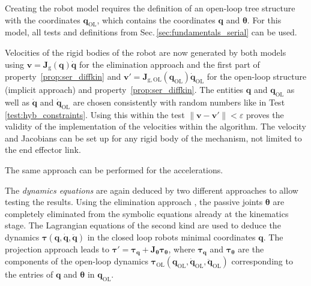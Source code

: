 \documentclass[runningheads]{llncs}
\begin{document}

\begin{property}\label{prop:hyb_velo}
Creating the robot model requires the definition of an open-loop tree structure with the coordinates $\bm{q}_\mathrm{OL}$, which contains the coordinates $\bm{q}$ and $\bm{\theta}$. For this model, all tests and definitions from Sec.\,\ref{sec:fundamentals_serial} can be used. 
\end{property}

\begin{test}\label{test:hyb_velo}
Velocities of the rigid bodies of the robot are now generated by both models using
$\bm{v}{=}\bm{J}_{\mathrm{g}}(\bm{q})\dot{\bm{q}}$ for the elimination approach and the first part of property~\ref{prop:ser_diffkin}
and
$\bm{v}'{=}\bm{J}_{\mathrm{g,OL}}(\bm{q}_{\mathrm{OL}})\dot{\bm{q}}_{\mathrm{OL}}$ for the open-loop structure (implicit approach) and property~\ref{prop:ser_diffkin}.
The entities $\bm{q}$ and $\bm{q}_{\mathrm{OL}}$ as well as $\dot{\bm{q}}$ and $\dot{\bm{q}}_{\mathrm{OL}}$ are chosen consistently with random numbers like in Test\,\ref{test:hyb_constraints}.
Using this within the test $\lVert \bm{v}{-}\bm{v}' \rVert {<} \varepsilon$ proves the validity of the implementation of the velocities within the algorithm.
The velocity and Jacobians can be set up for any rigid body of the mechanism, not limited to the end effector link.
\end{test}
The same approach can be performed for the accelerations.


\begin{property}\label{prop:hyb_dyn}
The \emph{dynamics equations} are again deduced by two different approaches to allow testing the results.
Using the elimination approach \cite{SchapplerLilHad2019}, the passive joints $\bm{\theta}$ are completely eliminated from the symbolic equations already at the kinematics stage.
The Lagrangian equations of the second kind are used to deduce the dynamics $\bm{\tau}(\bm{q},\dot{\bm{q}},\ddot{\bm{q}})$ in the closed loop robots minimal coordinates $\bm{q}$.
The projection approach leads to $\bm{\tau}'{=}\bm{\tau}_{\bm{q}}{+}\bm{J}_{\bm{\theta}}\bm{\tau}_{\bm{\theta}}$, where $\bm{\tau}_{\bm{q}}$ and $\bm{\tau}_{\bm{\theta}}$ are the components of the open-loop dynamics $\bm{\tau}_{\mathrm{OL}}(\bm{q}_{\mathrm{OL}},\dot{\bm{q}}_{\mathrm{OL}},\ddot{\bm{q}}_{\mathrm{OL}})$ corresponding to the entries of $\bm{q}$ and $\bm{\theta}$ in $\bm{q}_{\mathrm{OL}}$. 
\end{property}
\end{document}
